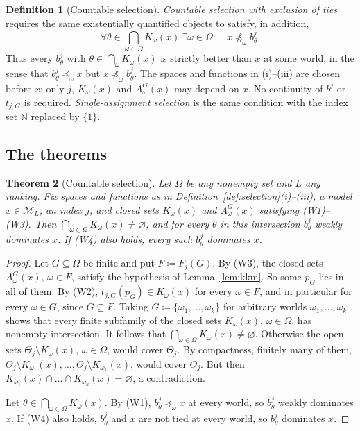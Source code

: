 \documentclass[11pt]{article}
\newtheorem{theorem}{Theorem}[section]
\theoremstyle{definition}
\newtheorem{definition}[theorem]{Definition}
\theoremstyle{remark}
\newcommand{\M}{\mathcal M}
\begin{document}
\begin{definition}[Countable selection]
\emph{Countable selection with exclusion of ties} requires the same existentially quantified objects to satisfy, in addition,
\[
\forall\theta\in\bigcap_{\omega\in\Omega}K_\omega(x)\
\exists\omega\in\Omega:\quad x\not\preceq_\omega b^j_\theta.
\tag{W4}\label{eq:notie}
\]
Thus every $b^j_\theta$ with $\theta\in\bigcap_\omega K_\omega(x)$ is strictly better than $x$ at some world, in the sense that $b^j_\theta\preceq_\omega x$ but $x\not\preceq_\omega b^j_\theta$. The spaces and functions in (i)--(iii) are chosen before $x$; only $j$, $K_\omega(x)$ and $A^G_\omega(x)$ may depend on $x$. No continuity of $b^j$ or $t_{j,G}$ is required. \emph{Single-assignment selection} is the same condition with the index set $\mathbb N$ replaced by $\{1\}$.
\end{definition}

\subsection{The theorems}

\begin{theorem}[Countable selection]\label{thm:general}
Let $\Omega$ be any nonempty set and $L$ any ranking. Fix spaces and functions as in Definition~\ref{def:selection}(i)--(iii), a model $x\in\M_L$, an index $j$, and closed sets $K_\omega(x)$ and $A^G_\omega(x)$ satisfying (W1)--(W3). Then $\bigcap_{\omega\in\Omega}K_\omega(x)\ne\varnothing$, and for every $\theta$ in this intersection $b^j_\theta$ weakly dominates $x$. If (W4) also holds, every such $b^j_\theta$ dominates $x$.
\end{theorem}
\begin{proof}
Let $G\subseteq\Omega$ be finite and put $F\coloneqq F_j(G)$. By (W3), the closed sets $A^G_\omega(x)$, $\omega\in F$, satisfy the hypothesis of Lemma~\ref{lem:kkm}. So some $p_G$ lies in all of them. By (W2), $t_{j,G}(p_G)\in K_\omega(x)$ for every $\omega\in F$, and in particular for every $\omega\in G$, since $G\subseteq F$. Taking $G\coloneqq\{\omega_1,\dots,\omega_k\}$ for arbitrary worlds $\omega_1,\dots,\omega_k$ shows that every finite subfamily of the closed sets $K_\omega(x)$, $\omega\in\Omega$, has nonempty intersection. It follows that $\bigcap_{\omega\in\Omega}K_\omega(x)\ne\varnothing$. Otherwise the open sets $\Theta_j\setminus K_\omega(x)$, $\omega\in\Omega$, would cover $\Theta_j$. By compactness, finitely many of them, $\Theta_j\setminus K_{\omega_1}(x),\dots,\Theta_j\setminus K_{\omega_k}(x)$, would cover $\Theta_j$. But then $K_{\omega_1}(x)\cap\dots\cap K_{\omega_k}(x)=\varnothing$, a contradiction.

Let $\theta\in\bigcap_{\omega\in\Omega}K_\omega(x)$. By (W1), $b^j_\theta\preceq_\omega x$ at every world, so $b^j_\theta$ weakly dominates $x$. If (W4) also holds, $b^j_\theta$ and $x$ are not tied at every world, so $b^j_\theta$ dominates $x$.
\end{proof}
\end{document}
